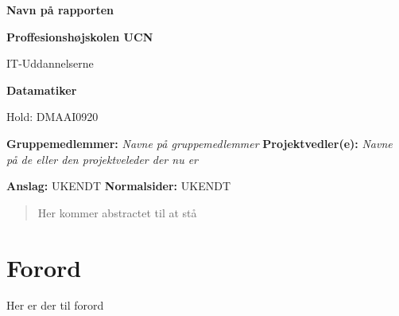 \documentclass[12pt, a4paper]{article}
\begin{document}
    
    \begin{multicols*}{2}
        \setlength{\parindent}{0pt}
        \Huge
        \textbf{Navn på rapporten}
        \newline

        \large
        \textbf{Proffesionshøjskolen UCN}
        \newline

        \normalsize
        IT-Uddannelserne
        \newline

        \large
        \textbf{Datamatiker}
        \newline

        \normalsize
        Hold: DMAAI0920
        \newline

        \textbf{Gruppemedlemmer:}
        \newline
        \emph{
            Navne på gruppemedlemmer\newline
        }
        \newline
        \textbf{Projektvedler(e):}\newline
        \emph{
            Navne på de eller den projektveleder der nu er\newline
        }
        \newline

        \textbf{Anslag:}
        \newline
        UKENDT
        \newline
        \newline
        \textbf{Normalsider:}
        \newline
        UKENDT
        \newline
        \vfill\null
        \columnbreak
        \begin{abstract}
            \noindent
            Her kommer abstractet til at stå
        \end{abstract}
    \end{multicols*}

    \Huge
    \section*{Forord}
        \normalsize
        Her er der til forord
        \pagebreak

        \tableofcontents
\end{document}

